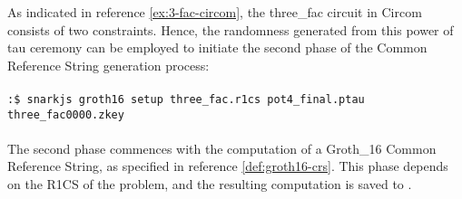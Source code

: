 \begin{example}
As indicated in reference \ref{ex:3-fac-circom}, the three\_fac circuit in Circom consists of two constraints. Hence, the randomness generated from this power of tau ceremony can be employed to initiate the second phase of the Common Reference String generation process:
\\
\\
\texttt{:\$ snarkjs groth16 setup three\_fac.r1cs pot4\_final.ptau \\ three\_fac0000.zkey}
\\
\\
The second phase commences with the computation of a Groth\_16 Common Reference String, as specified in reference \ref{def:groth16-crs}. This phase depends on the R1CS of the problem, and the resulting computation is saved to .


\end{example}
